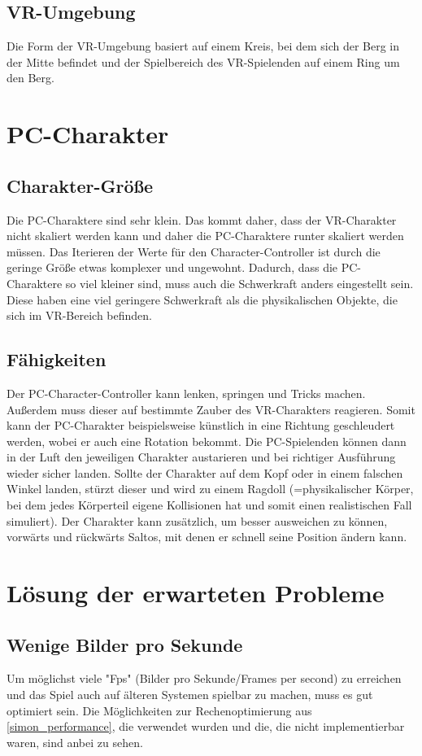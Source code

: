 \subsection{VR-Umgebung}
Die Form der VR-Umgebung basiert auf einem Kreis, bei dem sich der Berg in der Mitte befindet und der Spielbereich des VR-Spielenden auf einem Ring um den Berg.

\section{PC-Charakter}
\subsection{Charakter-Größe}
Die PC-Charaktere sind sehr klein. Das kommt daher, dass der VR-Charakter nicht skaliert werden kann und daher die PC-Charaktere runter skaliert werden müssen. Das Iterieren der Werte für den Character-Controller ist durch die geringe Größe etwas komplexer und ungewohnt. Dadurch, dass die PC-Charaktere so viel kleiner sind, muss auch die Schwerkraft anders eingestellt sein. Diese haben eine viel geringere Schwerkraft als die physikalischen Objekte, die sich im VR-Bereich befinden.

\subsection{Fähigkeiten}
Der PC-Character-Controller kann lenken, springen und Tricks machen. Außerdem muss dieser auf bestimmte Zauber des VR-Charakters reagieren. Somit kann der PC-Charakter beispielsweise künstlich in eine Richtung geschleudert werden, wobei er auch eine Rotation bekommt. Die PC-Spielenden können dann in der Luft den jeweiligen Charakter austarieren und bei richtiger Ausführung wieder sicher landen. Sollte der Charakter auf dem Kopf oder in einem falschen Winkel landen, stürzt dieser und wird zu einem Ragdoll (=physikalischer Körper, bei dem jedes Körperteil eigene Kollisionen hat und somit einen realistischen Fall simuliert).
Der Charakter kann zusätzlich, um besser ausweichen zu können, vorwärts und rückwärts Saltos, mit denen er schnell seine Position ändern kann.


\section{Lösung der erwarteten Probleme}\label{simon_problems}

\subsection{Wenige Bilder pro Sekunde}
Um möglichst viele "Fps" (Bilder pro Sekunde/Frames per second) zu erreichen und das Spiel auch auf älteren Systemen spielbar zu machen, muss es gut optimiert sein. Die Möglichkeiten zur Rechenoptimierung aus \ref{simon_performance}, die verwendet wurden und die, die nicht implementierbar waren, sind anbei zu sehen.

